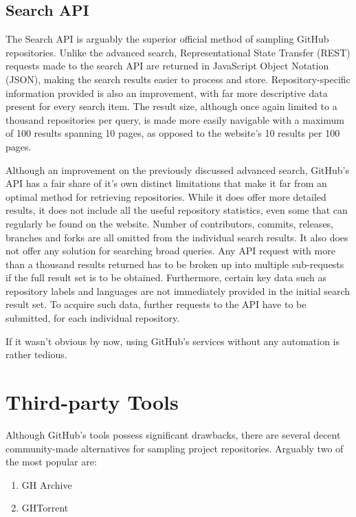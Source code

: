 \newpage
\subsection{Search API}

The Search API is arguably the superior official method of sampling GitHub repositories.
Unlike the advanced search, Representational State Transfer (REST) requests made to the search API are returned in JavaScript Object Notation (JSON), making the search results easier to process and store.
Repository-specific information provided is also an improvement, with far more descriptive data present for every search item.
The result size, although once again limited to a thousand repositories per query, is made more easily navigable with a maximum of 100 results spanning 10 pages, as opposed to the website's 10 results per 100 pages.

Although an improvement on the previously discussed advanced search, GitHub's API has a fair share of it's own distinct limitations that make it far from an optimal method for retrieving repositories.
While it does offer more detailed results, it does not include all the useful repository statistics, even some that can regularly be found on the website.
Number of contributors, commits, releases, branches and forks are all omitted from the individual search results.
It also does not offer any solution for searching broad queries.
Any API request with more than a thousand results returned has to be broken up into multiple sub-requests if the full result set is to be obtained.
Furthermore, certain key data such as repository labels and languages are not immediately provided in the initial search result set.
To acquire such data, further requests to the API have to be submitted, for each individual repository.

If it wasn't obvious by now, using GitHub's services without any automation is rather tedious.

\section{Third-party Tools}

Although GitHub's tools possess significant drawbacks, there are several decent community-made alternatives for sampling project repositories.
Arguably two of the most popular are:
\begin{enumerate}
    \item GH Archive
    \item GHTorrent
\end{enumerate}

